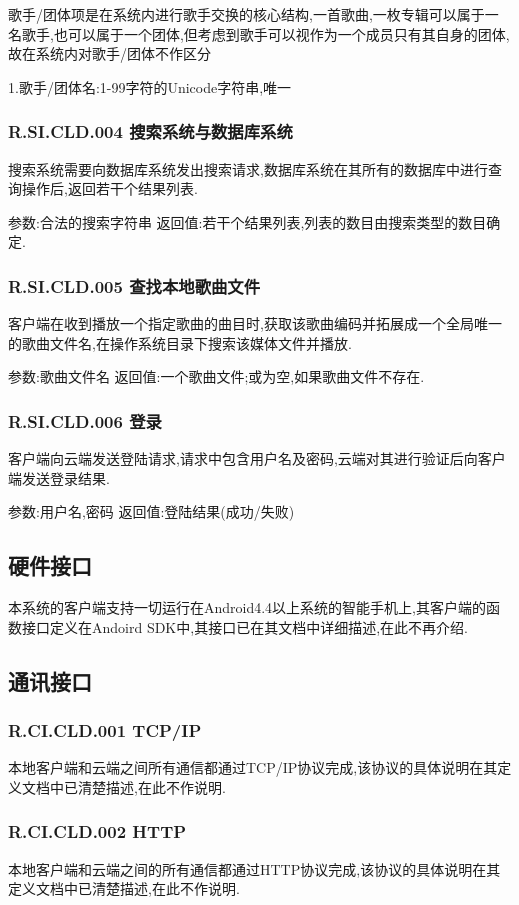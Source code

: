 歌手/团体项是在系统内进行歌手交换的核心结构,一首歌曲,一枚专辑可以属于一名歌手,也可以属于一个团体,但考虑到歌手可以视作为一个成员只有其自身的团体,故在系统内对歌手/团体不作区分

1.歌手/团体名:1-99字符的Unicode字符串,唯一

\subsubsection{R.SI.CLD.004 搜索系统与数据库系统}

搜索系统需要向数据库系统发出搜索请求,数据库系统在其所有的数据库中进行查询操作后,返回若干个结果列表.

参数:合法的搜索字符串
返回值:若干个结果列表,列表的数目由搜索类型的数目确定.

\subsubsection{R.SI.CLD.005 查找本地歌曲文件}

客户端在收到播放一个指定歌曲的曲目时,获取该歌曲编码并拓展成一个全局唯一的歌曲文件名,在操作系统目录下搜索该媒体文件并播放.

参数:歌曲文件名
返回值:一个歌曲文件;或为空,如果歌曲文件不存在.

\subsubsection{R.SI.CLD.006 登录}

客户端向云端发送登陆请求,请求中包含用户名及密码,云端对其进行验证后向客户端发送登录结果.

参数:用户名,密码
返回值:登陆结果(成功/失败)




\subsection{硬件接口} 

本系统的客户端支持一切运行在Android4.4以上系统的智能手机上,其客户端的函数接口定义在Andoird SDK中,其接口已在其文档中详细描述,在此不再介绍.

\subsection{通讯接口}

\subsubsection{R.CI.CLD.001 TCP/IP}

本地客户端和云端之间所有通信都通过TCP/IP协议完成,该协议的具体说明在其定义文档中已清楚描述,在此不作说明.

\subsubsection{R.CI.CLD.002 HTTP}

本地客户端和云端之间的所有通信都通过HTTP协议完成,该协议的具体说明在其定义文档中已清楚描述,在此不作说明.

